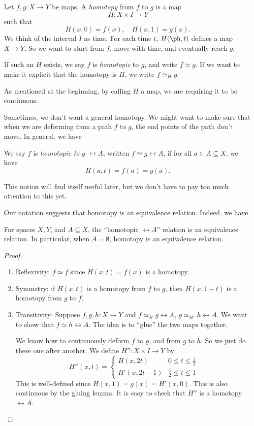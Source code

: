 \documentclass[a4paper]{article}
\begin{document}
\begin{defi}[Homotopy]
  Let $f, g: X\to Y$ be maps. A \emph{homotopy} from $f$ to $g$ is a map
  \[
    H: X\times I \to Y
  \]
  such that
  \[
    H(x, 0) = f(x),\quad H(x, 1) = g(x).
  \]
  We think of the interval $I$ as time. For each time $t$, $H(\ph, t)$ defines a map $X\to Y$. So we want to start from $f$, move with time, and eventually reach $g$.

  If such an $H$ exists, we say $f$ is \emph{homotopic} to $g$, and write $f\simeq g$. If we want to make it explicit that the homotopy is $H$, we write $f \simeq_H g$.
\end{defi}
As mentioned at the beginning, by calling $H$ a map, we are requiring it to be continuous.

Sometimes, we don't want a general homotopy. We might want to make sure that when we are deforming from a path $f$ to $g$, the end points of the path don't move. In general, we have
\begin{defi}
  We say $f$ is \emph{homotopic to} $g$ $\rel A$, written $f\simeq g\rel A$, if for all $a \in A\subseteq X$, we have
  \[
    H(a, t) = f(a) = g(a).
  \]
\end{defi}
This notion will find itself useful later, but we don't have to pay too much attention to this yet.

Our notation suggests that homotopy is an equivalence relation. Indeed, we have
\begin{prop}
  For spaces $X, Y$, and $A\subseteq X$, the ``homotopic $\rel A$'' relation is an equivalence relation. In particular, when $A = \emptyset$, homotopy is an equivalence relation.
\end{prop}

\begin{proof}\leavevmode
  \begin{enumerate}
    \item Reflexivity: $f \simeq f$ since $H(x, t) = f(x)$ is a homotopy.
    \item Symmetry: if $H(x, t)$ is a homotopy from $f$ to $g$, then $H(x, 1 - t)$ is a homotopy from $g$ to $f$.
    \item Transitivity: Suppose $f, g, h: X\to Y$ and $f\simeq_H g\rel A$, $g\simeq_{H'} h \rel A$. We want to show that $f\simeq h \rel A$. The idea is to ``glue'' the two maps together.

      We know how to continuously deform $f$ to $g$, and from $g$ to $h$. So we just do these one after another.
      We define $H'': X\times I \to Y$ by
      \[
        H''(x, t) =
        \begin{cases}
          H(x, 2t) & 0 \leq t \leq \frac{1}{2}\\
          H'(x, 2t - 1) & \frac{1}{2} \leq t \leq 1
        \end{cases}
      \]
      This is well-defined since $H(x, 1) = g(x) = H'(x, 0)$. This is also continuous by the gluing lemma. It is easy to check that $H''$ is a homotopy $\rel A$.\qedhere
  \end{enumerate}
\end{proof}
\end{document}
